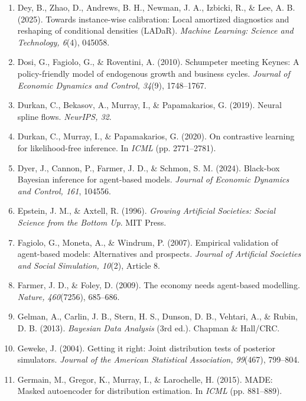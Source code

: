 \documentclass[12pt]{article}
\begin{document}
\begin{enumerate}
\item Dey, B., Zhao, D., Andrews, B. H., Newman, J. A., Izbicki, R., \& Lee, A. B. (2025). Towards instance-wise calibration: Local amortized diagnostics and reshaping of conditional densities (LADaR). \textit{Machine Learning: Science and Technology, 6}(4), 045058.

\item Dosi, G., Fagiolo, G., \& Roventini, A. (2010). Schumpeter meeting Keynes: A policy-friendly model of endogenous growth and business cycles. \textit{Journal of Economic Dynamics and Control, 34}(9), 1748--1767.

\item Durkan, C., Bekasov, A., Murray, I., \& Papamakarios, G. (2019). Neural spline flows. \textit{NeurIPS, 32}.

\item Durkan, C., Murray, I., \& Papamakarios, G. (2020). On contrastive learning for likelihood-free inference. In \textit{ICML} (pp. 2771--2781).

\item Dyer, J., Cannon, P., Farmer, J. D., \& Schmon, S. M. (2024). Black-box Bayesian inference for agent-based models. \textit{Journal of Economic Dynamics and Control, 161}, 104556.

\item Epstein, J. M., \& Axtell, R. (1996). \textit{Growing Artificial Societies: Social Science from the Bottom Up}. MIT Press.

\item Fagiolo, G., Moneta, A., \& Windrum, P. (2007). Empirical validation of agent-based models: Alternatives and prospects. \textit{Journal of Artificial Societies and Social Simulation, 10}(2), Article 8.

\item Farmer, J. D., \& Foley, D. (2009). The economy needs agent-based modelling. \textit{Nature, 460}(7256), 685--686.

\item Gelman, A., Carlin, J. B., Stern, H. S., Dunson, D. B., Vehtari, A., \& Rubin, D. B. (2013). \textit{Bayesian Data Analysis} (3rd ed.). Chapman \& Hall/CRC.

\item Geweke, J. (2004). Getting it right: Joint distribution tests of posterior simulators. \textit{Journal of the American Statistical Association, 99}(467), 799--804.

\item Germain, M., Gregor, K., Murray, I., \& Larochelle, H. (2015). MADE: Masked autoencoder for distribution estimation. In \textit{ICML} (pp. 881--889).


\end{enumerate}
\end{document}
